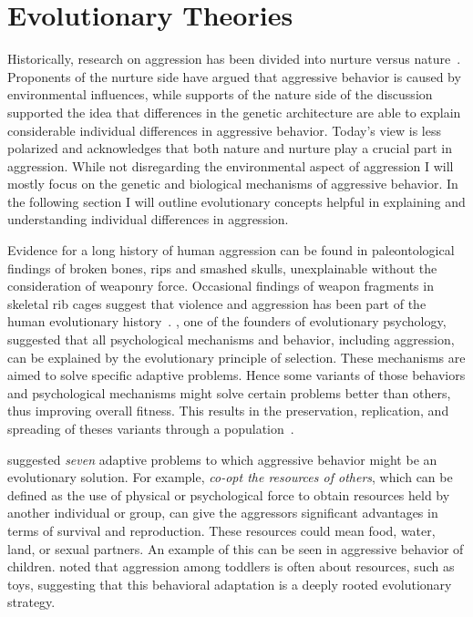 \section{Evolutionary Theories}
\label{sec:evolutionary_theories}

Historically, research on aggression has been divided into nurture versus nature~\cite{Archer2009}. 
Proponents of the nurture side have argued that aggressive behavior is caused by environmental influences, while supports of the nature side of the discussion supported the idea that differences in the genetic architecture are able to explain considerable individual differences in aggressive behavior.
Today's view is less polarized and acknowledges that both nature and nurture play a crucial part in aggression.
While not disregarding the environmental aspect of aggression I will mostly focus on the genetic and biological mechanisms of aggressive behavior.
In the following section I will outline evolutionary concepts helpful in explaining and understanding individual differences in aggression. 

Evidence for a long history of human aggression can be found in  paleontological findings of broken bones, rips and smashed skulls, unexplainable without the consideration of weaponry force.
Occasional findings of weapon fragments in skeletal rib cages suggest that violence and aggression has been part of the human evolutionary history~\citet{Buss1997}. 
\citet{Buss1997}, one of the founders of evolutionary psychology, suggested that all psychological mechanisms and behavior, including aggression, can be explained by the evolutionary principle of selection.  
These mechanisms are aimed to solve specific adaptive problems.
Hence some variants of those behaviors and psychological mechanisms might solve certain problems better than others, thus improving overall fitness.
This results in the preservation, replication, and spreading of theses variants through a population~\cite{Buss1997}.

\citet{Buss1997} suggested \textit{seven} adaptive problems to which aggressive behavior might be an evolutionary solution.
For example, \textit{co-opt the resources of others}, which can be defined as the use of physical or psychological force to obtain resources held by another individual or group, can give the aggressors significant advantages in terms of survival and reproduction.
These resources could mean food, water, land, or sexual partners.
An example of this can be seen in aggressive behavior of children.
\citet{Campbell1995} noted that aggression among toddlers is often about resources, such as toys, suggesting that this behavioral adaptation is a deeply rooted evolutionary strategy.

